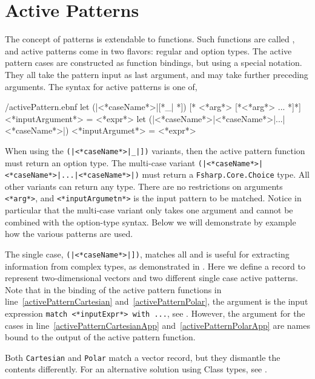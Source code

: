 \section{Active Patterns}
The concept of patterns is extendable to functions. Such functions are called , and active patterns come in two flavors: regular and option types. The active pattern cases are constructed as function bindings, but using a special notation. They all take the pattern input as last argument, and may take further preceding arguments. The syntax for active patterns is one of,
%
\begin{verbatimwrite}{\ebnf/activePattern.ebnf}
let (|<*caseName*>|[*_| *]) [* <*arg*> [*<*arg*> ... *]*] <*inputArgument*> = <*expr*>
let (|<*caseName*>|<*caseName*>|...|<*caseName*>|) <*inputArgumet*> = <*expr*>
\end{verbatimwrite}
%
When using the \lstinline[language=syntax]{(|<*caseName*>|_|])} variants, then the active pattern function must return an option type. The multi-case variant \lstinline[language=syntax]{(|<*caseName*>|<*caseName*>|...|<*caseName*>|)} must return a \lstinline{Fsharp.Core.Choice} type. All other variants can return any type. There are no restrictions on arguments \lstinline[language=syntax]{<*arg*>}, and \lstinline[language=syntax]{<*inputArgumetn*>} is the input pattern to be matched. Notice in particular that the multi-case variant only takes one argument and cannot be combined with the option-type syntax. Below we will demonstrate by example how the various patterns are used.

The single case, \lstinline[language=syntax]{(|<*caseName*>|])}, matches all and is useful for extracting information from complex types, as demonstrated in .
%
%
Here we define a record to represent two-dimensional vectors and two different single case active patterns. Note that in the binding of the active pattern functions in line~\ref{activePatternCartesian} and~\ref{activePatternPolar}, the argument is the input expression \lstinline[language=syntax]{match <*inputExpr*> with ...}, see . However, the argument for the cases in line~\ref{activePatternCartesianApp} and~\ref{activePatternPolarApp} are names bound to the output of the active pattern function.

Both \lstinline{Cartesian} and \lstinline{Polar} match a vector record, but they dismantle the contents differently. For an alternative solution using Class types, see . 

